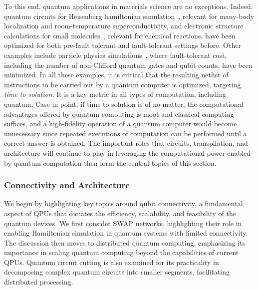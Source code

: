 To this end, quantum applications in materials science are no exceptions. Indeed, quantum circuits for Heisenberg hamiltonian simulation~\cite{childs2018toward,nam2019low}, relevant for many-body localization and room-temperature superconductivity, and electronic structure calculations for small molecules~\cite{nam2020trappedion,wang2021resource,wang2023ever}, relevant for chemical reactions, have been optimized for both pre-fault tolerant and fault-tolerant settings before. Other examples include particle physics simulations~\cite{shaw2020quantum,kan2021lattice,kan2022simulating}, where fault-tolerant cost, including the number of non-Clifford quantum gates and qubit counts, have been minimized. In all these examples, it is critical that the resulting netlist of instructions to be carried out by a quantum computer is optimized, targeting {\it time to solution}: It is a key metric in all types of computation, including quantum. Case in point, if time to solution is of no matter, the computational advantages offered by quantum computing is moot and classical computing suffices, and a high-fidelity operation of a quantum computer would become unnecessary since repeated executions of computation can be performed until a correct answer is obtained. The important roles that circuits, transpilation, and architecture will continue to play in leveraging the computational power enabled by quantum computation then form the central topics of this section.

\subsubsection{Connectivity and Architecture}
\label{sec:CNA}

We begin by highlighting key topics around qubit connectivity, a fundamental aspect of QPUs that dictates the efficiency, scalability, and feasibility of the quantum devices. We first consider SWAP networks, highlighting their role in enabling Hamiltonian simulation in quantum systems with limited connectivity. The discussion then moves to distributed quantum computing, emphasizing its importance in scaling quantum computing beyond the capabilities of current QPUs. Quantum circuit cutting is also examined for its practicality in decomposing complex quantum circuits into smaller segments, facilitating distributed processing.


